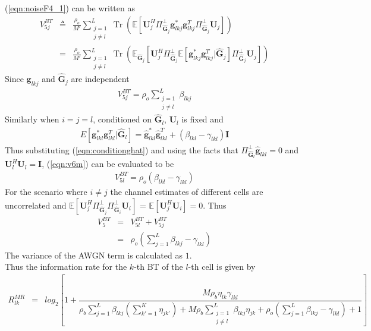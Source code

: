 \documentclass[10pt, a4paper, twoside,fleqn]{article}
\DeclareMathOperator{\Tr}{Tr}
\begin{document}
(\ref{eqn:noiseF4_1}) can be written as 
\begin{eqnarray}\label{eqn:v6m}
V_{5j}^{BT}&\triangleq& \frac{\rho_o}{M'}\sum\limits_{\substack{j=1 \\ j \neq l}}^{L} \Tr\left(\mathbb{E}\left[\pmb{U}_j^H \Pi^{\perp}_{\pmb{\widehat{G}}_j} \pmb{g}_{lkj}^* \pmb{g}_{lkj}^{T}\Pi^{\perp}_{\pmb{\widehat{G}}_j} \pmb{U}_j \right]\right) \nonumber \\
           &=& \frac{\rho_o}{M'}\sum_{\substack{j=1 \\ j \neq l}}^{L}\Tr\left(\mathbb{E}_{\pmb{\widehat{G}}_j}\left[\pmb{U}_j^H \Pi^{\perp}_{\pmb{\widehat{G}}_j} \mathbb{E}[\pmb{g}_{lkj}^* \pmb{g}_{lkj}^{T} | \pmb{\widehat{G}}_j]\Pi^{\perp}_{\pmb{\widehat{G}}_j} \pmb{U}_j \right]\right)
\end{eqnarray}
Since $\pmb{g}_{lkj}$ and $\pmb{\widehat{G}}_j$ are independent
\begin{eqnarray}\label{eqn:v6neql}
V_{5j}^{BT} = \rho_o\sum\limits_{\substack{j=1 \\ j \neq l}}^{L}\beta_{lkj}
\end{eqnarray}
Similarly when $i=j=l$, conditioned on $\pmb{\widehat{G}}_l$, $\pmb{U}_l$ is fixed and
\begin{eqnarray}\label{eqn:conditionghat}
E[\pmb{g}_{lkl}^*\pmb{g}_{lkl}^T|\pmb{\widehat{G}}_l] = \pmb{\hat g}_{lkl}^*\pmb{\hat g}_{lkl}^T + (\beta_{lkl}-\gamma_{lkl})\pmb{I}
\end{eqnarray}
Thus substituting (\ref{eqn:conditionghat}) and using the facts that $\Pi^{\perp}_{\pmb{\widehat{G}}_l}\pmb{\hat g}_{lkl} = 0$ and $\pmb{U}_l^H\pmb{U}_l=\pmb{I}$, (\ref{eqn:v6m}) can be evaluated to be
\begin{eqnarray}\label{eqn:v6l}
V_{5l}^{BT}= \rho_o(\beta_{lkl} -\gamma_{lkl})
\end{eqnarray}
For the scenario where $i\neq j$ the channel estimates of different cells are uncorrelated and $\mathbb{E}\left[\pmb{U}_j^H\Pi^{\perp}_{\pmb{\widehat{G}}_j}\Pi^{\perp}_{\pmb{\widehat{G}}_i} \pmb{U}_i\right]$ = $\mathbb{E}[\pmb{U}_j^H\pmb{U}_i] =0$. Thus
\begin{eqnarray}\label{eqn:v6}
   V_5^{BT} &=& V_{5l}^{BT} + V_{5j}^{BT} \nonumber \\ &=&\rho_o\left(\sum\limits_{j=1}^{L}\beta_{lkj}-\gamma_{lkl}\right)
\end{eqnarray}
The variance of the AWGN term is calculated as $1$.\\
Thus the information rate for the $k$-th BT of the $l$-th cell is given by
\begin{eqnarray}\label{eqn:rateotwitheta}
R_{lk}^{MR} &=& log_2\left[1+\dfrac{M\rho_b\eta_{lk}\gamma_{lkl}}{ \rho_b\sum\limits_{j=1}^{L}\beta_{lkj}\left(\sum\limits_{k'=1}^K\eta_{jk'}\right) +M\rho_b\sum\limits_{\substack{j=1 \\ j \neq l}}^{L}\beta_{lkj}\eta_{jk} +\rho_o\left(\sum\limits_{j=1}^{L}\beta_{lkj} -\gamma_{lkl}\right)+1}\right]
\end{eqnarray}
\end{document}
